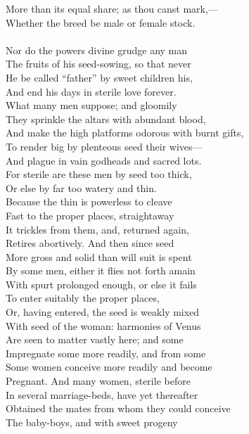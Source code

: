 More than its equal share; as thou canst mark,—\\
Whether the breed be male or female stock.\\
\\
Nor do the powers divine grudge any man\\
The fruits of his seed-sowing, so that never\\
He be called ``father'' by sweet children his,\\
And end his days in sterile love forever.\\
What many men suppose; and gloomily\\
They sprinkle the altars with abundant blood,\\
And make the high platforms odorous with burnt gifts,\\
To render big by plenteous seed their wives—\\
And plague in vain godheads and sacred lots.\\
For sterile are these men by seed too thick,\\
Or else by far too watery and thin.\\
Because the thin is powerless to cleave\\
Fast to the proper places, straightaway\\
It trickles from them, and, returned again,\\
Retires abortively. And then since seed\\
More gross and solid than will suit is spent\\
By some men, either it flies not forth amain\\
With spurt prolonged enough, or else it fails\\
To enter suitably the proper places,\\
Or, having entered, the seed is weakly mixed\\
With seed of the woman: harmonies of Venus\\
Are seen to matter vastly here; and some\\
Impregnate some more readily, and from some\\
Some women conceive more readily and become\\
Pregnant. And many women, sterile before\\
In several marriage-beds, have yet thereafter\\
Obtained the mates from whom they could conceive\\
The baby-boys, and with sweet progeny\\
